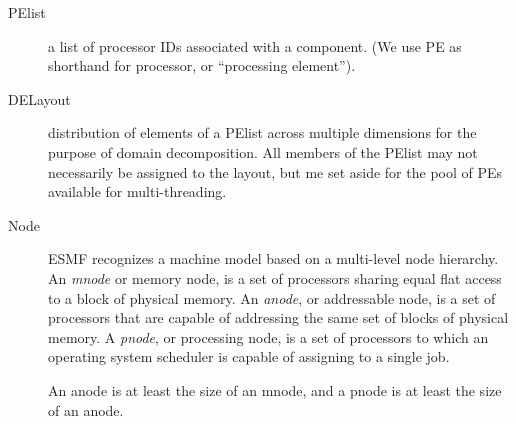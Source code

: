 
\begin{description}
\item[PElist] a list of processor IDs associated with a component. (We
  use PE as shorthand for processor, or ``processing element'').
\item[DELayout] distribution of elements of a PElist across multiple
  dimensions for the purpose of domain decomposition. All members of
  the PElist may not necessarily be assigned to the layout, but me
  set aside for the pool of PEs available for multi-threading.
\item[Node] ESMF recognizes a machine model based on a multi-level node
  hierarchy. An \emph{mnode} or memory node, is a set of processors
  sharing equal flat access to a block of physical memory. An
  \emph{anode}, or addressable node, is a set of processors that are
  capable of addressing the same set of blocks of physical memory. A
  \emph{pnode}, or processing node, is a set of processors to which an
  operating system scheduler is capable of assigning to a single job.

  An anode is at least the size of an mnode, and a pnode is at least
  the size of an anode.
  

\end{description}
